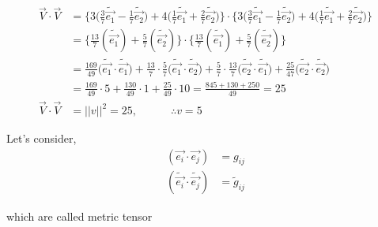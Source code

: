 \documentclass{article}
\begin{document}
	\begin{align*}
		\overrightarrow{V}\cdot\overrightarrow{V} &= \bigg\{3\bigg(\frac{3}{7}\widetilde{\overrightarrow{e_{1}}} - \frac{1}{7}\widetilde{\overrightarrow{e_{2}}}\bigg) + 4\bigg(\frac{1}{7}\widetilde{\overrightarrow{e_{1}}} + \frac{2}{7}\widetilde{\overrightarrow{e_{2}}}\bigg)\bigg\}\cdot\bigg\{3\bigg(\frac{3}{7}\widetilde{\overrightarrow{e_{1}}} - \frac{1}{7}\widetilde{\overrightarrow{e_{2}}}\bigg) + 4\bigg(\frac{1}{7}\widetilde{\overrightarrow{e_{1}}} + \frac{2}{7}\widetilde{\overrightarrow{e_{2}}}\bigg)\bigg\}\\
												  &= \bigg\{\frac{13}{7}(\widetilde{\overrightarrow{e_{1}}}) + \frac{5}{7}(\widetilde{\overrightarrow{e_{2}}})\bigg\}\cdot\bigg\{\frac{13}{7}(\widetilde{\overrightarrow{e_{1}}}) + \frac{5}{7}(\widetilde{\overrightarrow{e_{2}}})\bigg\}\\
												  &= \frac{169}{49}\big(\widetilde{\overrightarrow{e_{1}}}\cdot\widetilde{\overrightarrow{e_{1}}}\big) + \frac{13}{7}\cdot\frac{5}{7}\big(\widetilde{\overrightarrow{e_{1}}}\cdot\widetilde{\overrightarrow{e_{2}}}\big) + \frac{5}{7}\cdot\frac{13}{7}\big(\widetilde{\overrightarrow{e_{2}}}\cdot\widetilde{\overrightarrow{e_{1}}}\big) + \frac{25}{47}\big(\widetilde{\overrightarrow{e_{2}}}\cdot\widetilde{\overrightarrow{e_{2}}}\big)\\
												  &= \frac{169}{49}\cdot 5 + \frac{130}{49}\cdot 1 + \frac{25}{49}\cdot 10 = \frac{845 + 130 + 250}{49} = 25\\
		\overrightarrow{V}\cdot\overrightarrow{V} &= ||v||^{2} = 25, \quad\quad\quad \therefore v = 5						
	\end{align*}

	Let's consider,
	\begin{align*}
		(\overrightarrow{e_{i}}\cdot \overrightarrow{e_{j}}) & = g_{ij}\\
		(\widetilde{\overrightarrow{e_{i}}}\cdot \widetilde{\overrightarrow{e_{j}}}) &= \widetilde{g}_{ij}
	\end{align*}

	which are called metric tensor 
	
\end{document}
